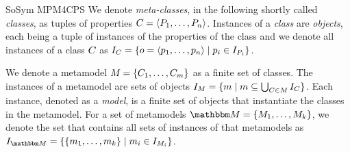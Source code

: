 \begin{copiedFrom}{SoSym MPM4CPS}
We denote \emph{meta-classes}, in the following shortly called \emph{classes}, as tuples of properties $C_{} = \langle P_1, \dots, P_n \rangle$. 
Instances of a \emph{class} are \emph{objects}, each being a tuple of instances of the properties of the class and we denote all instances of a class $C_{}$ as $I_{C} = \{ o = \langle p_1, \dots, p_n \rangle \mid p_i \in I_{P_i} \}$.

We denote a metamodel $M_{} = \{ C_{1}, \dots, C_{m} \}$ as a finite set of classes.
The instances of a metamodel are sets of objects $I_{M} = \{ m \mid m \subseteq \bigcup_{C_{} \in M_{}} I_{C} \}$.
Each instance, denoted as a \emph{model}, is a finite set of objects that instantiate the classes in the metamodel.
For a set of metamodels $\metamodelset{M} = \setted{\metamodel{M}{1}, \dots, \metamodel{M}{k}}$, we denote the set that contains all sets of instances of that metamodels as $\metamodelinstances{\metamodelset{M}} = \setted{ \setted{\model{m}{1}, \dots, \model{m}{k}} \mid \model{m}{i} \in \metamodelinstances{\metamodel{M}{i}}}$.








\end{copiedFrom}
